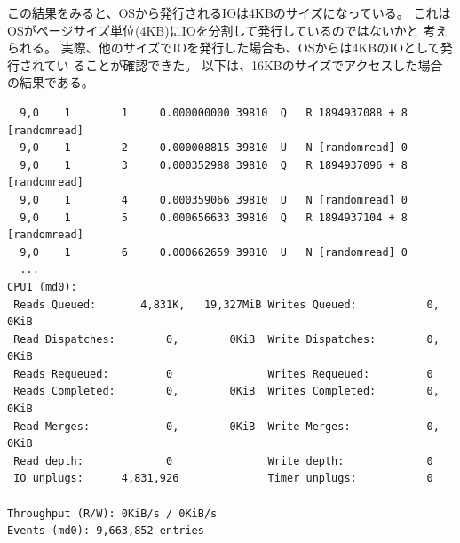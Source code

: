 \documentclass[11pt,a4paper]{jsarticle}
\begin{document}
この結果をみると、OSから発行されるIOは4KBのサイズになっている。
これはOSがページサイズ単位(4KB)にIOを分割して発行しているのではないかと
考えられる。
実際、他のサイズでIOを発行した場合も、OSからは4KBのIOとして発行されてい
ることが確認できた。
以下は、16KBのサイズでアクセスした場合の結果である。
\begin{verbatim}
  9,0    1        1     0.000000000 39810  Q   R 1894937088 + 8 [randomread]
  9,0    1        2     0.000008815 39810  U   N [randomread] 0
  9,0    1        3     0.000352988 39810  Q   R 1894937096 + 8 [randomread]
  9,0    1        4     0.000359066 39810  U   N [randomread] 0
  9,0    1        5     0.000656633 39810  Q   R 1894937104 + 8 [randomread]
  9,0    1        6     0.000662659 39810  U   N [randomread] 0
  ...
CPU1 (md0):
 Reads Queued:       4,831K,   19,327MiB Writes Queued:           0,        0KiB
 Read Dispatches:        0,        0KiB  Write Dispatches:        0,        0KiB
 Reads Requeued:         0               Writes Requeued:         0
 Reads Completed:        0,        0KiB  Writes Completed:        0,        0KiB
 Read Merges:            0,        0KiB  Write Merges:            0,        0KiB
 Read depth:             0               Write depth:             0
 IO unplugs:      4,831,926              Timer unplugs:           0

Throughput (R/W): 0KiB/s / 0KiB/s
Events (md0): 9,663,852 entries
\end{verbatim}
\end{document}
